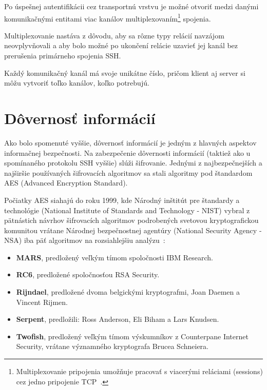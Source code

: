 Po úspešnej autentifikácii cez transportnú vrstvu je možné otvoriť medzi danými komunikačnými entitami viac kanálov multiplexovaním\footnote{Multiplexovanie
pripojenia umožňuje pracovať s viacerými reláciami (sessions) cez jedno pripojenie TCP~\cite{SshSecurity}.} spojenia.

Multiplexovanie nastáva z dôvodu, aby sa rôzne typy relácií navzájom neovplyvňovali a aby bolo možné po ukončení relácie
uzavieť jej kanál bez prerušenia primárneho spojenia SSH.

Každý komunikačný kanál má svoje unikátne číslo, pričom klient aj server si môžu vytvoriť toľko kanálov, koľko potrebujú.

\section{Dôvernosť informácií}\label{sec:dovernost-informacii}

Ako bolo spomenuté vyššie, dôvernosť informácií je jedným z hlavných aspektov informačnej bezpečnosti.
Na zabezpečenie dôvernosti informácií (taktiež ako u spomínaného protokolu SSH vyššie) slúži šifrovanie.
Jednými z najbezpečnejších a najširšie používaných šifrovacích algoritmov sa stali algoritmy pod štandardom AES (Advanced Encryption Standard).

Počiatky AES siahajú do roku 1999, kde Národný inštitút pre štandardy a technológie (National Institute of Standards and Technology -
NIST) vybral z pätnástich návrhov šifrovacích algoritmov podrobených svetovou kryptografickou komunitou vrátane Národnej
bezpečnostnej agentúry (National Security Agency - NSA) iba päť algoritmov na rozsiahlejšiu analýzu~\cite{AdvancedEncryptionStandard}:

\begin{itemize}
    \item \textbf{MARS}, predložený veľkým tímom spoločnosti IBM Research.
    \item \textbf{RC6}, predložené spoločnosťou RSA Security.
    \item \textbf{Rijndael}, predložené dvoma belgickými kryptografmi, Joan Daemen a Vincent Rijmen.
    \item \textbf{Serpent}, predložili: Ross Anderson, Eli Biham a Lars Knudsen.
    \item \textbf{Twofish}, predložený veľkým tímom výskumníkov z Counterpane Internet Security, vrátane významného kryptografa Brucea Schneiera.
\end{itemize}

